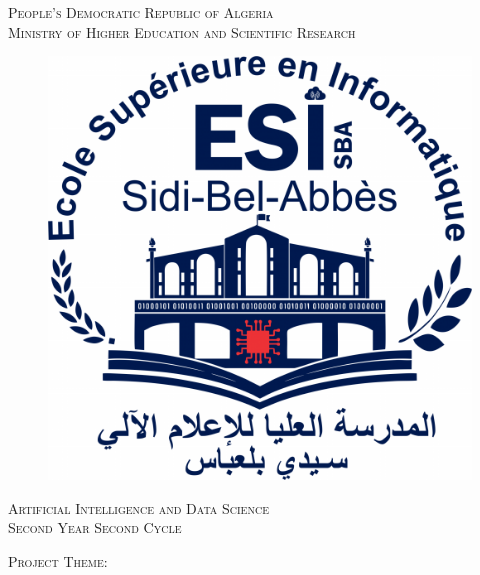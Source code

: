 \documentclass[
11pt, %
english, %
singlespacing, %
headsepline, %
]{project_structure}
\author{ 
\href{mailto:ab.fellah@esi-sba.dz}{Abdelnour \textsc{Fellah}} \\
\href{mailto:a.benounene@esi-sba.dz}{Abderrahmane \textsc{Benounene}} \\ 
\href{mailto:aa.mokadem@esi-sba.dz}{Adel Abdelkader \textsc{Mokadem}} \\ 
\href{mailto:me.mekki@esi-sba.dz}{Meriem \textsc{Mekki}} \\ 
\href{mailto:yl.benyamina@esi-sba.dz}{Yacine Lazreg \textsc{Benyamina}} \\ 
}
\begin{document}

\makeatletter
\renewcommand*{\ps@plain}{%
  \let\@mkboth\@gobbletwo
  \let\@oddhead\@empty
  \def\@oddfoot{%
    \reset@font
    \hfil
    \thepage
    \hfil
  }%
  \let\@evenhead\@empty
  \let\@evenfoot\@oddfoot
}
\makeatother
\pagestyle{plain} %


\begin{titlepage}
\begin{center}

\textsc{People's Democratic Republic of Algeria}\\
\vspace*{.001\textheight} 
\textsc{Ministry of Higher Education and Scientific Research}

\vspace*{.02\textheight}

\begin{figure}[h]
    \centering
    \includegraphics[width=0.2\linewidth]{figures/esisba_logo.png}
\end{figure}

{\scshape\LARGE \univname\par} \vspace*{.02\textheight}%
\textsc{Artificial Intelligence and Data Science}\\
\textsc{Second Year Second Cycle}\vspace{1cm}

\textsc{\Large Project Theme:}\\[0.5cm] %

\HRule \\[0.4cm] %
{\huge \bfseries \ttitle\par}\vspace{0.4cm} %
\HRule \\[1cm] %
 

\end{center}
\end{titlepage}
\end{document}
